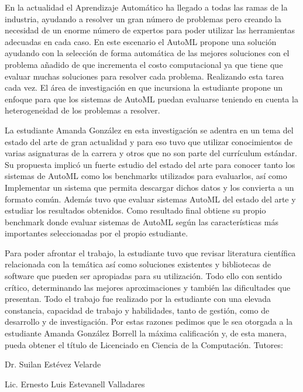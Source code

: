 \begin{opinion}
    En la actualidad el Aprendizaje Automático ha llegado a todas las ramas de la industria, ayudando a resolver un gran número de problemas pero 
creando la necesidad de un enorme número de expertos para poder utilizar las herramientas adecuadas en cada caso.
En este escenario el AutoML propone una solución ayudando con la selección de forma automática de las mejores soluciones con el problema añadido de que incrementa
el costo computacional ya que tiene que evaluar muchas soluciones para resolver cada problema. Realizando esta tarea cada vez.
El área de investigación en que incursiona la estudiante propone un enfoque para que los sistemas de AutoML puedan evaluarse teniendo en cuenta la heterogeneidad de los problemas a resolver.

La estudiante Amanda González en esta investigación se adentra en un tema del estado del arte de gran actualidad y para eso tuvo que utilizar conocimientos de varias asignaturas de la carrera y otros que no son parte del currículum estándar.
Su propuesta implicó un fuerte estudio del estado del arte para conocer tanto los sistemas de AutoML como los benchmarks utilizados para evaluarlos, así como Implementar un sistema que permita descargar dichos datos y los convierta a un formato común.  Además tuvo que evaluar sistemas AutoML del estado del arte y estudiar los resultados obtenidos. 
Como resultado final obtiene su propio benchmark donde evaluar sistemas de AutoML según las características más importantes seleccionadas por el propio estudiante.

Para poder afrontar el trabajo, la estudiante tuvo que revisar literatura científica relacionada con la temática así como soluciones existentes y bibliotecas de software que pueden ser apropiadas para su utilización. Todo ello con sentido crítico, determinando las mejores aproximaciones y también las dificultades que presentan.
Todo el trabajo fue realizado por la estudiante con una elevada constancia, capacidad de trabajo y habilidades, tanto de gestión, como de desarrollo y de investigación.
Por estas razones pedimos que le sea otorgada a la estudiante Amanda González Borrell la máxima calificación y, de esta manera, pueda obtener el título de Licenciado en Ciencia de la Computación.
\newpage
\centering
Tutores: 

Dr. Suilan Estévez Velarde

Lic. Ernesto Luis Estevanell Valladares 

\begingroup
\centering
{}
\hspace{1.5cm}
\par
\endgroup
\end{opinion}